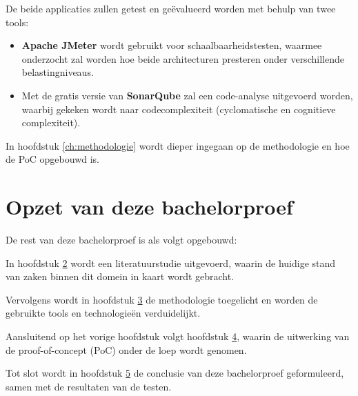 De beide applicaties zullen getest en geëvalueerd worden met behulp van twee tools:

\begin{itemize}
	\item \textbf{Apache JMeter} wordt gebruikt voor schaalbaarheidstesten, waarmee onderzocht zal worden hoe beide architecturen presteren onder verschillende belastingniveaus.
	\item Met de gratis versie van \textbf{SonarQube} zal een code-analyse uitgevoerd worden, waarbij gekeken wordt naar codecomplexiteit (cyclomatische en cognitieve complexiteit).
\end{itemize}

In hoofdstuk \ref{ch:methodologie} wordt dieper ingegaan op de methodologie en hoe de PoC opgebouwd is.

\section{Opzet van deze bachelorproef}

De rest van deze bachelorproef is als volgt opgebouwd:

In hoofdstuk \hyperref[ch:stand-van-zaken]{2} wordt een literatuurstudie uitgevoerd, waarin de huidige stand van zaken binnen dit domein in kaart wordt gebracht.

Vervolgens wordt in hoofdstuk \hyperref[ch:methodologie]{3} de methodologie toegelicht en worden de gebruikte tools en technologieën verduidelijkt.

Aansluitend op het vorige hoofdstuk volgt hoofdstuk \hyperref[ch:uitwerking]{4}, waarin de uitwerking van de proof-of-concept (PoC) onder de loep wordt genomen.

Tot slot wordt in hoofdstuk \hyperref[ch:conclusie]{5} de conclusie van deze bachelorproef geformuleerd, samen met de resultaten van de testen.



